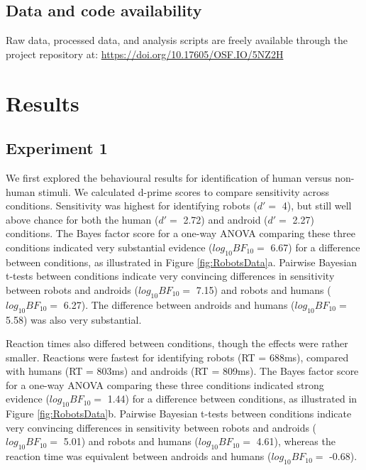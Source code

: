 \documentclass[
]{article}
\begin{document}
\subsection{Data and code availability}\label{data-and-code-availability}

Raw data, processed data, and analysis scripts are freely available through the project repository at: \url{https://doi.org/10.17605/OSF.IO/5NZ2H}

\section{Results}\label{results}

\subsection{Experiment 1}\label{experiment-1}

We first explored the behavioural results for identification of human versus non-human stimuli. We calculated d-prime scores to compare sensitivity across conditions. Sensitivity was highest for identifying robots (\(d' =\) 4), but still well above chance for both the human (\(d' =\) 2.72) and android (\(d' =\) 2.27) conditions. The Bayes factor score for a one-way ANOVA comparing these three conditions indicated very substantial evidence (\(log_{10}BF_{10} =\) 6.67) for a difference between conditions, as illustrated in Figure \ref{fig:RobotsData}a. Pairwise Bayesian t-tests between conditions indicate very convincing differences in sensitivity between robots and androids (\(log_{10}BF_{10} =\) 7.15) and robots and humans (\(log_{10}BF_{10} =\) 6.27). The difference between androids and humans (\(log_{10}BF_{10} =\) 5.58) was also very substantial.

Reaction times also differed between conditions, though the effects were rather smaller. Reactions were fastest for identifying robots (RT = 688ms), compared with humans (RT = 803ms) and androids (RT = 809ms). The Bayes factor score for a one-way ANOVA comparing these three conditions indicated strong evidence (\(log_{10}BF_{10} =\) 1.44) for a difference between conditions, as illustrated in Figure \ref{fig:RobotsData}b. Pairwise Bayesian t-tests between conditions indicate very convincing differences in sensitivity between robots and androids (\(log_{10}BF_{10} =\) 5.01) and robots and humans (\(log_{10}BF_{10} =\) 4.61), whereas the reaction time was equivalent between androids and humans (\(log_{10}BF_{10} =\) -0.68).
\end{document}
